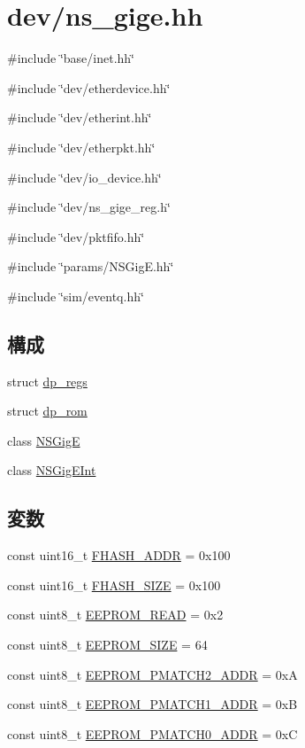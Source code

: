 \hypertarget{ns__gige_8hh}{
\section{dev/ns\_\-gige.hh}
\label{ns__gige_8hh}
}
{\ttfamily \#include \char`\"{}base/inet.hh\char`\"{}}\par
{\ttfamily \#include \char`\"{}dev/etherdevice.hh\char`\"{}}\par
{\ttfamily \#include \char`\"{}dev/etherint.hh\char`\"{}}\par
{\ttfamily \#include \char`\"{}dev/etherpkt.hh\char`\"{}}\par
{\ttfamily \#include \char`\"{}dev/io\_\-device.hh\char`\"{}}\par
{\ttfamily \#include \char`\"{}dev/ns\_\-gige\_\-reg.h\char`\"{}}\par
{\ttfamily \#include \char`\"{}dev/pktfifo.hh\char`\"{}}\par
{\ttfamily \#include \char`\"{}params/NSGigE.hh\char`\"{}}\par
{\ttfamily \#include \char`\"{}sim/eventq.hh\char`\"{}}\par
\subsection*{構成}
\begin{DoxyCompactItemize}
\item 
struct \hyperlink{structdp__regs}{dp\_\-regs}
\item 
struct \hyperlink{structdp__rom}{dp\_\-rom}
\item 
class \hyperlink{classNSGigE}{NSGigE}
\item 
class \hyperlink{classNSGigEInt}{NSGigEInt}
\end{DoxyCompactItemize}
\subsection*{変数}
\begin{DoxyCompactItemize}
\item 
const uint16\_\-t \hyperlink{ns__gige_8hh_a351fddd1359b79f333a7680e36221a73}{FHASH\_\-ADDR} = 0x100
\item 
const uint16\_\-t \hyperlink{ns__gige_8hh_a7d7c3db3667c7110b37292d81dc81362}{FHASH\_\-SIZE} = 0x100
\item 
const uint8\_\-t \hyperlink{ns__gige_8hh_a93964da128d1f6ec065f0d049a6ee86a}{EEPROM\_\-READ} = 0x2
\item 
const uint8\_\-t \hyperlink{ns__gige_8hh_adb0e1024d46141c966014951f5b1e5c8}{EEPROM\_\-SIZE} = 64
\item 
const uint8\_\-t \hyperlink{ns__gige_8hh_a04ace9703bc38e08ebc513308e810472}{EEPROM\_\-PMATCH2\_\-ADDR} = 0xA
\item 
const uint8\_\-t \hyperlink{ns__gige_8hh_aa5de04551e0949c15f9b84774373f1d8}{EEPROM\_\-PMATCH1\_\-ADDR} = 0xB
\item 
const uint8\_\-t \hyperlink{ns__gige_8hh_acac34df6d31e87d4ae3e715f42bd770d}{EEPROM\_\-PMATCH0\_\-ADDR} = 0xC
\end{DoxyCompactItemize}


